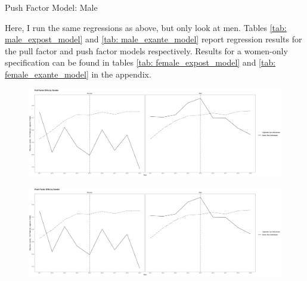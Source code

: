 \documentclass[12pt,letterpaper]{article}
\begin{document}
\begin{table}[htbp]
    \centering
    \caption{Push Factor Model: Male}
    \label{tab: male_exante_model}
    
\end{table}
Here, I run the same regressions as above, but only look at men. Tables \ref{tab: male_expost_model} and \ref{tab: male_exante_model} report regression results for the pull factor and push factor models respectively. Results for a women-only specification can be found in tables \ref{tab: female_expost_model} and \ref{tab: female_exante_model} in the appendix.
\begin{figure}[htbp]
    \centering
    \includegraphics[width=1\linewidth]{outputs/summary_stats/sex_post_diffs.png}
    \caption{}
    \label{fig: sex_post_diffs}
\end{figure}
\begin{figure}[htbp]
    \centering
    \includegraphics[width=1\linewidth]{outputs/summary_stats/sex_ante_diffs.png}
    \caption{}
    \label{fig: sex_ante_diffs}
\end{figure}
\end{document}

